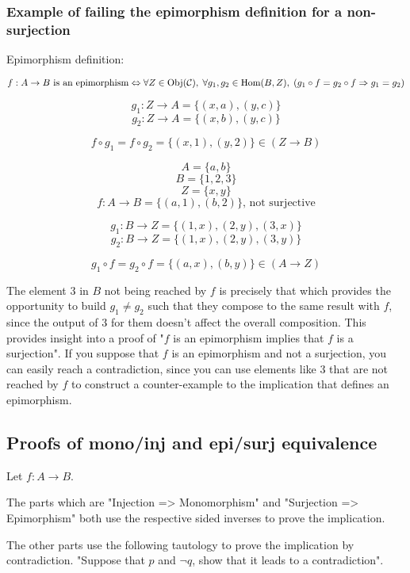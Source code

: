 \documentclass[12pt, letterpaper, twoside]{report}
\begin{document}
\subsubsection*{Example of failing the epimorphism definition for a non-surjection}

Epimorphism definition:

$$
\text{$f : A \to B$ is an epimorphism}
\\ \Leftrightarrow \\ 
\forall Z \in \text{Obj}(\mathcal{C}), \;
\forall g_1, g_2 \in \text{Hom}(B, Z), \;
(g_1 \circ f = g_2 \circ f \Rightarrow g_1 = g_2)
$$



$$g_1 : Z \to A = \{ (x, a), (y, c) \}$$
$$g_2 : Z \to A = \{ (x, b), (y, c) \}$$

$$f \circ g_1 = f \circ g_2 = \{(x, 1), (y, 2)\} \in (Z \to B)$$


$$A = \{ a, b    \}$$
$$B = \{ 1, 2, 3 \}$$
$$Z = \{ x, y    \}$$
$$f : A \to B = \{ (a, 1), (b, 2) \} \text{, not surjective}$$


$$g_1 : B \to Z = \{ (1, x), (2, y), (3, x) \}$$
$$g_2 : B \to Z = \{ (1, x), (2, y), (3, y) \}$$

$$g_1 \circ f = g_2 \circ f = \{(a, x), (b, y)\} \in (A \to Z)$$

The element $3$ in $B$ not being reached by $f$ is precisely that which provides the opportunity to build $g_1 \neq g_2$ such that they compose to the same result with $f$, since the output of $3$ for them doesn't affect the overall composition. This provides insight into a proof of "$f$ is an epimorphism implies that $f$ is a surjection". If you suppose that $f$ is an epimorphism and not a surjection, you can easily reach a contradiction, since you can use elements like $3$ that are not reached by $f$ to construct a counter-example to the implication that defines an epimorphism.



\subsection*{Proofs of mono/inj and epi/surj equivalence}

Let $f : A \to B$.

The parts which are "Injection => Monomorphism" and "Surjection => Epimorphism" both use the respective sided inverses to prove the implication.

The other parts use the following tautology to prove the implication by contradiction. "Suppose that $p$ and $\neg q$, show that it leads to a contradiction".
\end{document}
